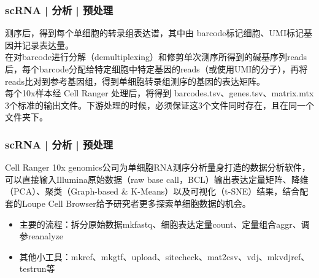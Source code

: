 \documentclass[11pt]{ctexbeamer}
\begin{document}
\begin{frame}
  \frametitle{scRNA | 分析 | 预处理}
  测序后，得到每个单细胞的转录组表达谱，其中由 \alert{barcode标记细胞}、\alert{UMI标记基因}并记录表达量。\\ \vspace{0.5em}
  在对barcode进行分解（demultiplexing）和修剪单次测序所得到的碱基序列reads后，每个barcode分配给特定细胞中特定基因的reads（或使用UMI的分子），再将reads比对到参考基因组，得到单细胞转录组测序的基因的表达矩阵。\\ \vspace{0.5em}
  每个10x样本经 \alert{Cell Ranger} 处理后，将得到 \alert{barcodes.tsv、genes.tsv、matrix.mtx} 3个标准的输出文件。下游处理的时候，必须保证这3个文件同时存在，且在同一个文件夹下。
\end{frame}

\begin{frame}
  \frametitle{scRNA | 分析 | 预处理}
  \begin{block}{Cell Ranger}
 10x genomics公司为单细胞RNA测序分析量身打造的数据分析软件，可以直接输入Illumina原始数据（raw base call，BCL）输出表达定量矩阵、降维（PCA）、聚类（Graph-based \& K-Means）以及可视化（t-SNE）结果，结合配套的Loupe Cell Browser给予研究者更多探索单细胞数据的机会。
 \begin{itemize}
 \item 主要的流程：拆分原始数据mkfastq、细胞表达定量count、定量组合aggr、调参reanalyze
 \item 其他小工具：mkref、mkgtf、upload、sitecheck、mat2csv、vdj、mkvdjref、testrun等
 \end{itemize}
  \end{block}
\end{frame}
\end{document}
